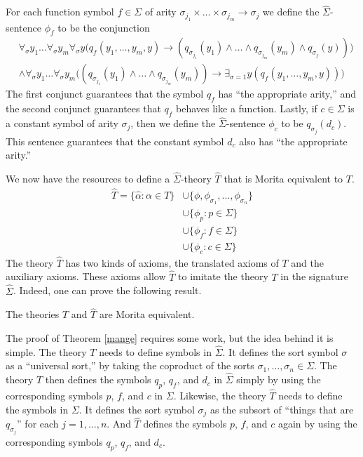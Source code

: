 For each function symbol $f\in\Sigma$ of arity
$\sigma_{j_1}\times\ldots\times\sigma_{j_m}\rightarrow\sigma_j$ we
define the $\widehat{\Sigma}$-sentence $\phi_{f}$ to be the
conjunction
\begin{align*}
&\forall_\sigma y_1\ldots\forall_\sigma y_m \forall_\sigma y\big(q_{f}(y_1,\ldots, y_m, y)\rightarrow (q_{\sigma_{j_1}}(y_1)\land\ldots\land q_{\sigma_{j_m}}(y_m)\land q_{\sigma_j}(y))\big)\\
%
&\land \forall_\sigma y_1\ldots\forall_\sigma y_m\big((q_{\sigma_{j_1}}(y_1)\land\ldots\land q_{\sigma_{j_m}}(y_m))\rightarrow\exists_{\sigma=1} y(q_{f}(y_1,\ldots, y_m, y))\big)
\end{align*}
The first conjunct guarantees that the symbol $q_{f}$ has ``the
appropriate arity,'' and the second conjunct guarantees that $q_f$
behaves like a function. Lastly, if $c\in\Sigma$ is a constant symbol
of arity $\sigma_j$, then we define the $\widehat{\Sigma}$-sentence
$\phi_{c}$ to be $q_{\sigma_j}(d_{c})$. This sentence guarantees that
the constant symbol $d_{c}$ also has ``the appropriate arity.''

We now have the resources to define a $\widehat{\Sigma}$-theory
$\widehat{T}$ that is Morita equivalent to $T$.
\begin{align*}
  \widehat{T}=\{\widehat{\alpha}: \alpha\in T\} & \cup \{\phi,
  \phi_{\sigma_1},\ldots,\phi_{\sigma_n}\}\\ &\cup \{\phi_{p}:
  p\in\Sigma\}\\ &\cup \{\phi_{f}: f\in \Sigma\}\\ &\cup \{\phi_{c}:
  c\in\Sigma\}
\end{align*}
The theory $\widehat{T}$ has two kinds of axioms, the translated
axioms of $T$ and the auxiliary axioms.  These axioms allow
$\widehat{T}$ to imitate the theory $T$ in the signature
$\widehat{\Sigma}$. Indeed, one can prove the following result.


\begin{thm}[Barrett] The theories $T$ and $\widehat{T}$ are Morita
  equivalent. \label{mange}
\end{thm}

The proof of Theorem \ref{mange} requires some work, but the idea
behind it is simple.  The theory $T$ needs to define symbols in
$\widehat{\Sigma}$. It defines the sort symbol $\sigma$ as a
``universal sort,'' by taking the coproduct of the sorts
$\sigma_1,\ldots, \sigma_n\in\Sigma$.
The theory $T$ then defines the symbols $q_p$, $q_f$, and $d_c$ in
$\widehat{\Sigma}$ simply by using the corresponding symbols $p$, $f$,
and $c$ in $\Sigma$.  Likewise, the theory $\widehat{T}$ needs to
define the symbols in $\Sigma$.  It defines the sort symbol $\sigma_j$
as the subsort of ``things that are $q_{\sigma_j}$'' for each
$j=1,\ldots, n$.  And $\widehat{T}$ defines the symbols $p$, $f$, and
$c$ again by using the corresponding symbols $q_p$, $q_f$, and $d_c$.


